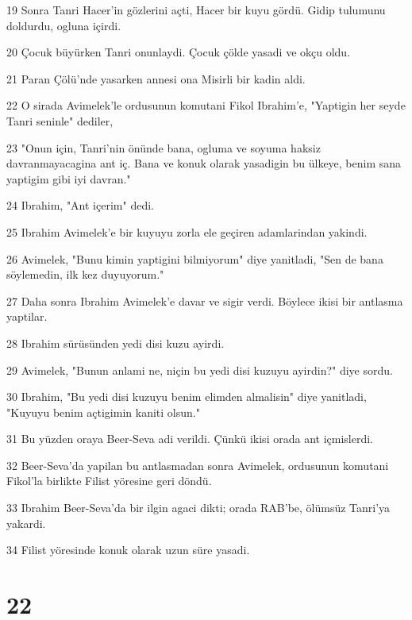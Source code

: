 \par 19 Sonra Tanri Hacer'in gözlerini açti, Hacer bir kuyu gördü. Gidip tulumunu doldurdu, ogluna içirdi.
\par 20 Çocuk büyürken Tanri onunlaydi. Çocuk çölde yasadi ve okçu oldu.
\par 21 Paran Çölü'nde yasarken annesi ona Misirli bir kadin aldi.
\par 22 O sirada Avimelek'le ordusunun komutani Fikol Ibrahim'e, "Yaptigin her seyde Tanri seninle" dediler,
\par 23 "Onun için, Tanri'nin önünde bana, ogluma ve soyuma haksiz davranmayacagina ant iç. Bana ve konuk olarak yasadigin bu ülkeye, benim sana yaptigim gibi iyi davran."
\par 24 Ibrahim, "Ant içerim" dedi.
\par 25 Ibrahim Avimelek'e bir kuyuyu zorla ele geçiren adamlarindan yakindi.
\par 26 Avimelek, "Bunu kimin yaptigini bilmiyorum" diye yanitladi, "Sen de bana söylemedin, ilk kez duyuyorum."
\par 27 Daha sonra Ibrahim Avimelek'e davar ve sigir verdi. Böylece ikisi bir antlasma yaptilar.
\par 28 Ibrahim sürüsünden yedi disi kuzu ayirdi.
\par 29 Avimelek, "Bunun anlami ne, niçin bu yedi disi kuzuyu ayirdin?" diye sordu.
\par 30 Ibrahim, "Bu yedi disi kuzuyu benim elimden almalisin" diye yanitladi, "Kuyuyu benim açtigimin kaniti olsun."
\par 31 Bu yüzden oraya Beer-Seva adi verildi. Çünkü ikisi orada ant içmislerdi.
\par 32 Beer-Seva'da yapilan bu antlasmadan sonra Avimelek, ordusunun komutani Fikol'la birlikte Filist yöresine geri döndü.
\par 33 Ibrahim Beer-Seva'da bir ilgin agaci dikti; orada RAB'be, ölümsüz Tanri'ya yakardi.
\par 34 Filist yöresinde konuk olarak uzun süre yasadi.

\chapter{22}

